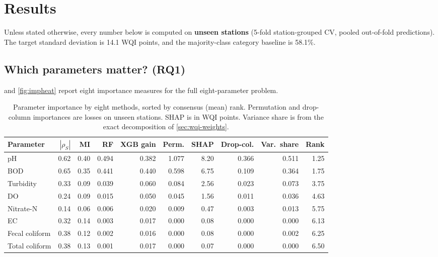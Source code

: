 \section{Results}
\label{sec:results}

Unless stated otherwise, every number below is computed on \textbf{unseen stations} (5-fold station-grouped CV, pooled out-of-fold predictions). The target standard deviation is 14.1 WQI points, and the majority-class category baseline is 58.1\%.

\subsection{Which parameters matter? (RQ1)}
\label{sec:res-importance}

 and \cref{fig:impheat} report eight importance measures for the full eight-parameter problem.

\begin{table}[h]
\centering\small
\caption{Parameter importance by eight methods, sorted by consensus (mean) rank. Permutation and drop-column importances are \R{} losses on unseen stations. SHAP is in WQI points. Variance share is from the exact decomposition of \cref{sec:wqi-weights}.}
\label{tab:importance}
\begin{tabular}{lrrrrrrrrr}
\toprule
Parameter & $|\rho_S|$ & MI & RF & XGB gain & Perm. & SHAP & Drop-col. & Var.\ share & Rank \\
\midrule
pH & 0.62 & 0.40 & 0.494 & 0.382 & 1.077 & 8.20 & 0.366 & 0.511 & 1.25 \\
BOD & 0.65 & 0.35 & 0.441 & 0.440 & 0.598 & 6.75 & 0.109 & 0.364 & 1.75 \\
Turbidity & 0.33 & 0.09 & 0.039 & 0.060 & 0.084 & 2.56 & 0.023 & 0.073 & 3.75 \\
DO & 0.24 & 0.09 & 0.015 & 0.050 & 0.045 & 1.56 & 0.011 & 0.036 & 4.63 \\
Nitrate-N & 0.14 & 0.06 & 0.006 & 0.020 & 0.009 & 0.47 & 0.003 & 0.013 & 5.75 \\
EC & 0.32 & 0.14 & 0.003 & 0.017 & 0.000 & 0.08 & 0.000 & 0.000 & 6.13 \\
Fecal coliform & 0.38 & 0.12 & 0.002 & 0.016 & 0.000 & 0.08 & 0.000 & 0.002 & 6.25 \\
Total coliform & 0.38 & 0.13 & 0.001 & 0.017 & 0.000 & 0.07 & 0.000 & 0.000 & 6.50 \\
\bottomrule
\end{tabular}
\end{table}

